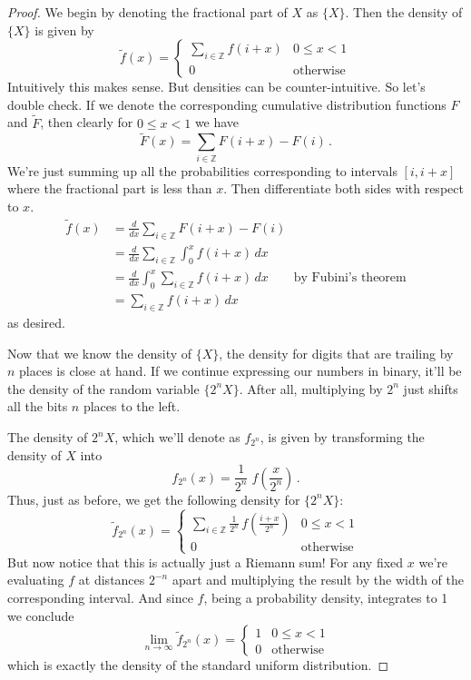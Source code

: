 \documentclass{article}
\theoremstyle{theorem}
\theoremstyle{definition}
\begin{document}
\begin{proof}
We begin by denoting the fractional part of $X$ as $\{X\}$. Then the density of $\{X\}$ is given by
\[
\tilde{f}(x) =
\begin{cases}
\sum_{i\in\mathbb{Z}}f(i+x) & 0 \leq x < 1\\
0 & \text{otherwise}
\end{cases}
\]
Intuitively this makes sense. But densities can be counter-intuitive. So let's double check. If we denote the corresponding cumulative distribution functions $F$ and $\tilde{F}$, then clearly for $0 \leq x < 1$ we have
\[
\tilde{F}(x) = \sum_{i\in\mathbb{Z}}F(i+x)-F(i)\,.
\]
We're just summing up all the probabilities corresponding to intervals $[i,i+x]$ where the fractional part is less than $x$. Then differentiate both sides with respect to $x$.
\[
\begin{split}
\tilde{f}(x) & =\frac{d}{dx}\sum_{i\in\mathbb{Z}}F(i+x)-F(i)\\
& =\frac{d}{dx}\sum_{i\in\mathbb{Z}}\int_0^x f(i+x)\,dx\\
& =\frac{d}{dx}\int_0^x\sum_{i\in\mathbb{Z}}f(i+x)\,dx\qquad\text{by Fubini's theorem}\\
& =\sum_{i\in\mathbb{Z}}f(i+x)\,dx
\end{split}
\]
as desired.

Now that we know the density of $\{X\}$, the density for digits that are trailing by $n$ places is close at hand. If we continue expressing our numbers in binary, it'll be the density of the random variable $\{2^nX\}$. After all, multiplying by $2^n$ just shifts all the bits $n$ places to the left.

The density of $2^nX$, which we'll denote as $f_{2^n}$, is given by transforming the density of $X$ into
\[
f_{2^n}(x) = \frac{1}{2^n}\;f\left(\frac{x}{2^n}\right)\,.
\]
Thus, just as before, we get the following density for $\{2^nX\}$:
\[
\tilde{f}_{2^n}(x)=
\begin{cases}
\sum_{i\in\mathbb{Z}}\frac{1}{2^n}\,f\left(\frac{i+x}{2^n}\right) & 0\leq x < 1\\
0 & \text{otherwise}
\end{cases}
\]
But now notice that this is actually just a Riemann sum! For any fixed $x$ we're evaluating $f$ at distances $2^{-n}$ apart and multiplying the result by the width of the corresponding interval. And since $f$, being a probability density, integrates to 1 we conclude
\[
\lim_{n\rightarrow\infty}\tilde{f}_{2^n}(x) = 
\begin{cases}
1 & 0\leq x< 1\\
0 & \text{otherwise}
\end{cases}
\]
which is exactly the density of the standard uniform distribution.
\end{proof}
\end{document}
